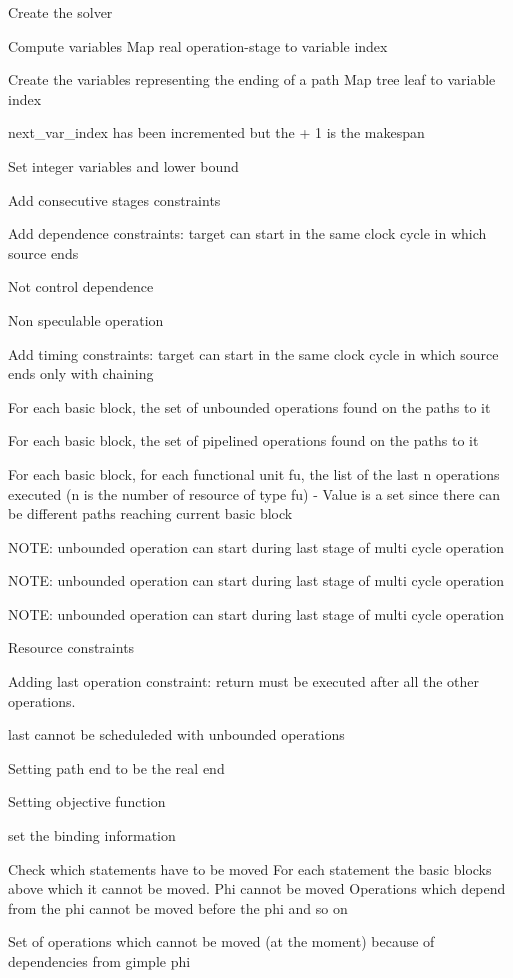 Create the solver

Compute variables Map real operation-\/stage to variable index

Create the variables representing the ending of a path Map tree leaf to variable index

next\+\_\+var\+\_\+index has been incremented but the + 1 is the makespan

Set integer variables and lower bound

Add consecutive stages constraints

Add dependence constraints\+: target can start in the same clock cycle in which source ends

Not control dependence

Non speculable operation

Add timing constraints\+: target can start in the same clock cycle in which source ends only with chaining

For each basic block, the set of unbounded operations found on the paths to it

For each basic block, the set of pipelined operations found on the paths to it

For each basic block, for each functional unit fu, the list of the last n operations executed (n is the number of resource of type fu) -\/ Value is a set since there can be different paths reaching current basic block

N\+O\+TE\+: unbounded operation can start during last stage of multi cycle operation

N\+O\+TE\+: unbounded operation can start during last stage of multi cycle operation

N\+O\+TE\+: unbounded operation can start during last stage of multi cycle operation

Resource constraints

Adding last operation constraint\+: return must be executed after all the other operations.

last cannot be scheduleded with unbounded operations

Setting path end to be the real end

Setting objective function

set the binding information

Check which statements have to be moved For each statement the basic blocks above which it cannot be moved. Phi cannot be moved Operations which depend from the phi cannot be moved before the phi and so on

Set of operations which cannot be moved (at the moment) because of dependencies from gimple phi

